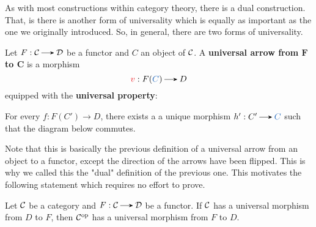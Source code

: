     As with most constructions within category theory, there is a dual construction. 
    That, is there is another form of universality which is equally as important 
    as the one we originally introduced. 
    So, in general, there are two forms of universality.
    \begin{definition}\label{definition:universal_morphism_from_F_to_D}
       Let $F: \cc \to \dd$ be a functor and $C$ an object of $\mathcal{C}$. A
       \textbf{universal arrow from $\bm{F}$ to $\bm{C}$} is a morphism 
       \[
            \textcolor{Red}{v}: F(\textcolor{NavyBlue}{C}) \to D
       \]
       equipped with the \textbf{universal property}:
       \begin{center}
           \begin{minipage}{0.8\textwidth}
                For every $f: F(C') \to D$, there exists a
                a unique morphism $h': C' \to \textcolor{NavyBlue}{C}$ such 
                that the diagram below commutes.
           \end{minipage}
            \hspace{1cm}
        \end{center}
     \end{definition}
    Note that this is basically the previous definition
    of a universal arrow from an object to a functor, except the
    direction of the arrows have been flipped. This is why we called
    this the "dual" definition of the previous one. This motivates the following 
    statement which requires no effort to prove. 

    \begin{proposition}
        Let $\mathcal{C}$ be a category and $F: \cc \to \dd$ be a functor. 
        If $\mathcal{C}$ has a universal morphism from $D$ to $F$, 
        then $\mathcal{C}^{\mathrm{op}}$ has a universal morphism from $F$ to $D$. 
    \end{proposition}

